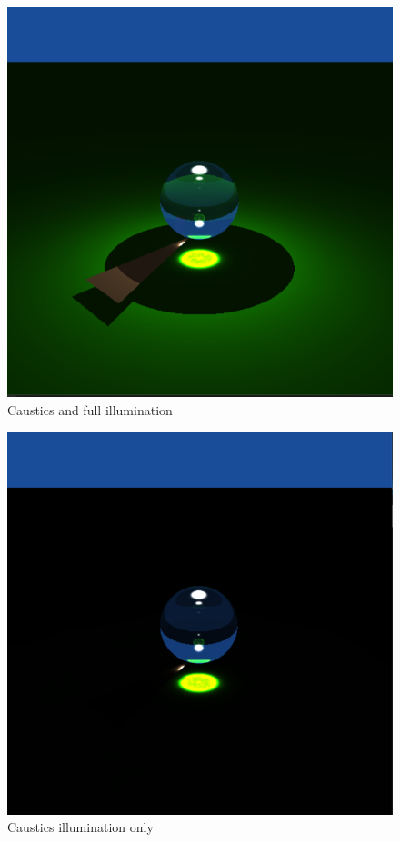 \begin{figure}[H]
	\centering
	\includegraphics[scale=\imagescale]{images/worksheet_7/caustics_full_illum}
	\caption{Caustics and full illumination}
	\label{fig:caustics_full_illum}
\end{figure}

\begin{figure}[H]
	\centering
	\includegraphics[scale=\imagescale]{images/worksheet_7/caustics_only}
	\caption{Caustics illumination only}
	\label{fig:caustics_only}
\end{figure}
